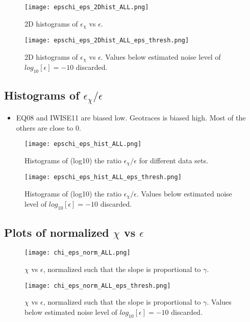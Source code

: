 \documentclass[11pt]{article}
\begin{document}
\begin{figure}[htbp]
\texttt{[image: epschi\_eps\_2Dhist\_ALL.png]}
\caption{2D histograms of $\epsilon_{\chi}$ vs $\epsilon$.}
\label{2Dhist}
\end{figure}


\begin{figure}[htbp]
\texttt{[image: epschi\_eps\_2Dhist\_ALL\_eps\_thresh.png]}
\caption{2D histograms of $\epsilon_{\chi}$ vs $\epsilon$. Values below estimated noise level of $log_{10}[\epsilon]=-10$ discarded.}
\label{2Dhistthresh}
\end{figure}




\clearpage
\subsection{Histograms of $\epsilon_{\chi}/\epsilon$}


\begin{itemize}

\item EQ08 and IWISE11 are biased low. Geotraces is biased high. Most of the others are close to 0.

\end{itemize}


\begin{figure}[htbp]
\texttt{[image: epschi\_eps\_hist\_ALL.png]}
\caption{Histograms of (log10) the ratio $\epsilon_{\chi}/\epsilon$ for different data sets.}
\label{}
\end{figure}


\begin{figure}[htbp]
\texttt{[image: epschi\_eps\_hist\_ALL\_eps\_thresh.png]}
\caption{Histograms of (log10) the ratio $\epsilon_{\chi}/\epsilon$. Values below estimated noise level of $log_{10}[\epsilon]=-10$ discarded.}
\label{}
\end{figure}





\clearpage
\subsection{Plots of normalized $\chi$ vs $\epsilon$}

\begin{figure}[htbp]
\texttt{[image: chi\_eps\_norm\_ALL.png]}
\caption{$\chi$ vs $\epsilon$, normalized such that the slope is proportional to $\gamma$.}
\label{}
\end{figure}


\begin{figure}[htbp]
\texttt{[image: chi\_eps\_norm\_ALL\_eps\_thresh.png]}
\caption{$\chi$ vs $\epsilon$, normalized such that the slope is proportional to $\gamma$. Values below estimated noise level of $log_{10}[\epsilon]=-10$ discarded.}
\label{}
\end{figure}








\end{document}
